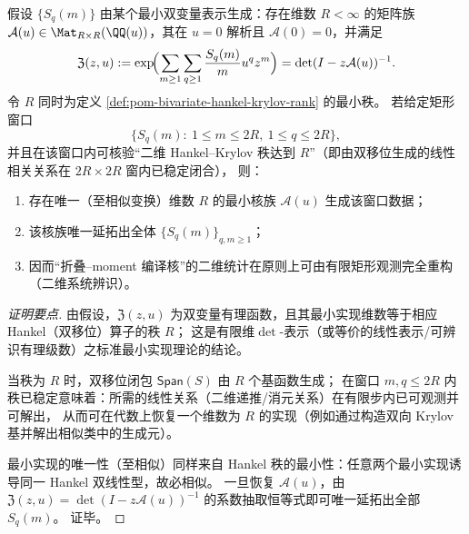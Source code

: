 \begin{theorem}\label{thm:pom-bivariate-system-identification-finite-window}
假设 \(\{S_q(m)\}\) 由某个最小双变量表示生成：存在维数 \(R<\infty\) 的矩阵族
\(\mathcal{A}(u)\in\Mat_{R\times R}(\QQ(u))\)，其在 \(u=0\) 解析且 \(\mathcal{A}(0)=0\)，并满足
\[
\mathfrak{Z}(z,u)
:=\exp\!\Bigl(\sum_{m\ge1}\sum_{q\ge1}\frac{S_q(m)}{m}u^q z^m\Bigr)
=\det(I-z\mathcal{A}(u))^{-1}.
\]
令 \(R\) 同时为定义 \ref{def:pom-bivariate-hankel-krylov-rank} 的最小秩。
若给定矩形窗口
\[
\{S_q(m):\ 1\le m\le 2R,\ 1\le q\le 2R\},
\]
并且在该窗口内可核验“二维 Hankel--Krylov 秩达到 \(R\)”（即由双移位生成的线性相关关系在 \(2R\times 2R\) 窗内已稳定闭合），
则：
\begin{enumerate}
  \item 存在唯一（至相似变换）维数 \(R\) 的最小核族 \(\mathcal{A}(u)\) 生成该窗口数据；
  \item 该核族唯一延拓出全体 \(\{S_q(m)\}_{q,m\ge1}\)；
  \item 因而“折叠--moment 编译核”的二维统计在原则上可由有限矩形观测完全重构（二维系统辨识）。
\end{enumerate}
\end{theorem}
\begin{proof}[证明要点]
由假设，\(\mathfrak{Z}(z,u)\) 为双变量有理函数，且其最小实现维数等于相应 Hankel（双移位）算子的秩 \(R\)；
这是有限维\(\det\)-表示（或等价的线性表示/可辨识有理级数）之标准最小实现理论的结论。
\par
当秩为 \(R\) 时，双移位闭包 \(\mathsf{Span}(S)\) 由 \(R\) 个基函数生成；
在窗口 \(m,q\le 2R\) 内秩已稳定意味着：所需的线性关系（二维递推/消元关系）在有限步内已可观测并可解出，
从而可在代数上恢复一个维数为 \(R\) 的实现（例如通过构造双向 Krylov 基并解出相似类中的生成元）。
\par
最小实现的唯一性（至相似）同样来自 Hankel 秩的最小性：任意两个最小实现诱导同一 Hankel 双线性型，故必相似。
一旦恢复 \(\mathcal{A}(u)\)，由
\(
\mathfrak{Z}(z,u)=\det(I-z\mathcal{A}(u))^{-1}
\)
的系数抽取恒等式即可唯一延拓出全部 \(S_q(m)\)。
证毕。
\end{proof}

